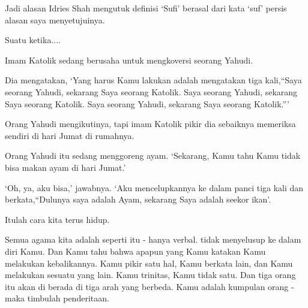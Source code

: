 Jadi alasan Idries Shah mengutuk definisi ‘Sufi’ berasal dari kata ‘suf’ persis alasan saya menyetujuinya.

Suatu ketika....

Imam Katolik sedang berusaha untuk mengkoversi seorang Yahudi.

Dia mengatakan, ‘Yang harus Kamu lakukan adalah mengatakan tiga kali,“Saya seorang Yahudi, sekarang Saya seorang Katolik. Saya seorang Yahudi, sekarang Saya seorang Katolik. Saya seorang Yahudi, sekarang Saya seorang Katolik.”’

Orang Yahudi mengikutinya, tapi imam Katolik pikir dia sebaiknya memeriksa sendiri di hari Jumat di rumahnya.

Orang Yahudi itu sedang menggoreng ayam. ‘Sekarang, Kamu tahu Kamu tidak bisa makan ayam di hari Jumat.’

‘Oh, ya, aku bisa,’ jawabnya. ‘Aku mencelupkannya ke dalam panci tiga kali dan berkata,“Dulunya saya adalah Ayam, sekarang Saya adalah seekor ikan'.

Itulah cara kita terus hidup.

Semua agama kita adalah seperti itu - hanya verbal. tidak menyelusup ke dalam diri Kamu. Dan Kamu tahu bahwa
apapun yang Kamu katakan Kamu melakukan kebalikannya. Kamu pikir satu hal, Kamu berkata lain, dan Kamu
melakukan sesuatu yang lain. Kamu trinitas, Kamu tidak satu. Dan tiga orang itu akan di berada di tiga
arah yang berbeda. Kamu adalah kumpulan orang - maka timbulah penderitaan.
